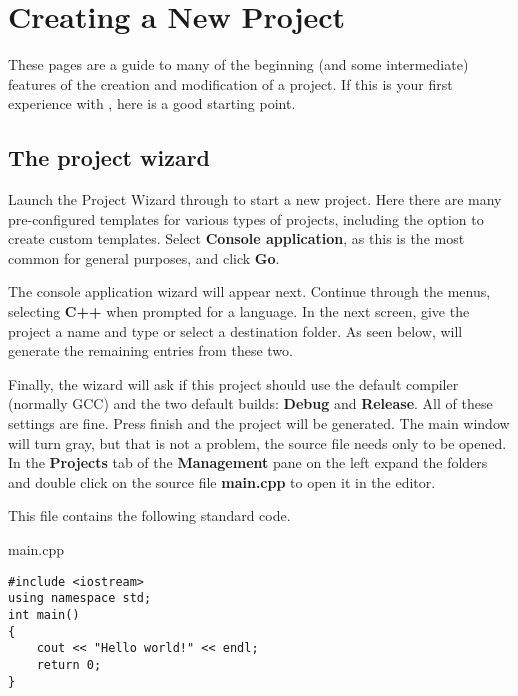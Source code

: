 \section{Creating a New Project}\label{sec:create_project}

These pages are a guide to many of the beginning (and some intermediate) features of the creation and modification of a \codeblocks project. If this is your first experience with \codeblocks, here is a good starting point. 
 
\subsection{The project wizard}

Launch the Project Wizard through  to start a new project. Here there are many pre-configured templates for various types of projects, including the option to create custom templates. Select  \textbf{Console application}, as this is the most common for general purposes, and click \textbf{Go}. 



The console application wizard will appear next. Continue through the menus, selecting \textbf{C++} when prompted for a language. In the next screen, give the project a name and type or select a destination folder. As seen below, \codeblocks will generate the remaining entries from these two. 


Finally, the wizard will ask if this project should use the default compiler (normally GCC) and the two default builds: \textbf{Debug} and \textbf{Release}. All of these settings are fine. Press finish and the project will be generated. The main window will turn gray, but that is not a problem, the source file needs only to be opened. In the \textbf{Projects} tab of the \textbf{Management} pane on the left expand the folders and double click on the source file \textbf{main.cpp} to open it in the editor. 


This file contains the following standard code.

main.cpp 
\begin{lstlisting}
#include <iostream>
using namespace std;
int main()
{
    cout << "Hello world!" << endl;
    return 0;
}
\end{lstlisting}

